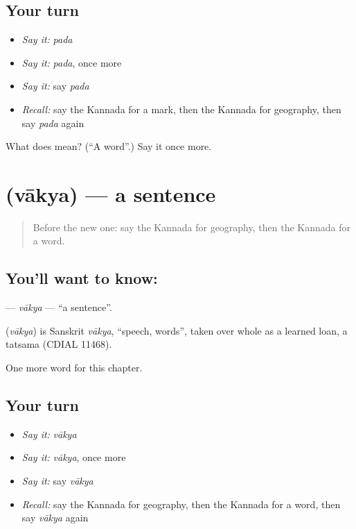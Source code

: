 \subsection*{Your turn}
\begin{itemize}
\raggedright
  \item \emph{Say it:} \emph{pada}
  \item \emph{Say it:} \emph{pada}, once more
  \item \emph{Say it:} say \emph{pada}
  \item \emph{Recall:} say the Kannada for a mark, then the Kannada for geography, then say \emph{pada} again
\end{itemize}

\begin{tcolorbox}[breakable,colback=teal!4,colframe=teal!35!black,title={Before you move on}]
What does  mean? (\textquotedblleft{}A word\textquotedblright{}.) Say it once more.
\end{tcolorbox}
\section[\texorpdfstring{\kn{ವಾಕ್ಯ} (vākya)}{ವಾಕ್ಯ (vākya)}]{ (vākya) — a sentence}

\label{lesson:KA-C270-vakya}



\begin{quote}
Before the new one: say the Kannada for geography, then the Kannada for a word.
\end{quote}

\subsection*{You'll want to know: }
\textbf{} — \emph{vākya} — \textquotedblleft{}a sentence\textquotedblright{}.

\begin{cousinweb}
\textbf{} (\emph{vākya}) is Sanskrit \emph{vākya}, \textquotedblleft{}speech, words\textquotedblright{}, taken over whole as a learned loan, a tatsama (CDIAL 11468).
\end{cousinweb}

\begin{grammarlens}[title={What you've built}]
One more word for this chapter.
\end{grammarlens}

\subsection*{Your turn}
\begin{itemize}
\raggedright
  \item \emph{Say it:} \emph{vākya}
  \item \emph{Say it:} \emph{vākya}, once more
  \item \emph{Say it:} say \emph{vākya}
  \item \emph{Recall:} say the Kannada for geography, then the Kannada for a word, then say \emph{vākya} again
\end{itemize}

